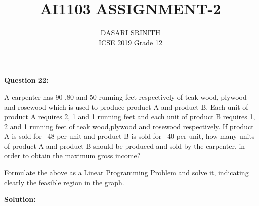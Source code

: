 \documentclass[journal,12pt,twocolumn]{IEEEtran}
\begin{document}
\title{AI1103 ASSIGNMENT-2}
\author{DASARI SRINITH \\\vspace*{20pt} \Large ICSE 2019 Grade 12}
\maketitle


\textbf{Question 22:}

A carpenter has 90 ,80 and 50 running feet respectively of teak wood, plywood and rosewood which is used to produce product A and product B.
Each unit of product A requires 2, 1 and 1 running feet and each unit of product B requires 1, 2 and 1 running feet of teak wood,plywood and rosewood respectively. 
If product A is sold for \rupee~$48$ per unit and product B is sold for \rupee~$40$ per unit,
how many units of product A and product B should be produced and sold by the carpenter, in order to obtain the maximum gross income?

Formulate the above as a Linear Programming Problem and solve it, indicating clearly the feasible region in the graph.

\textbf{Solution:}
\end{document}
